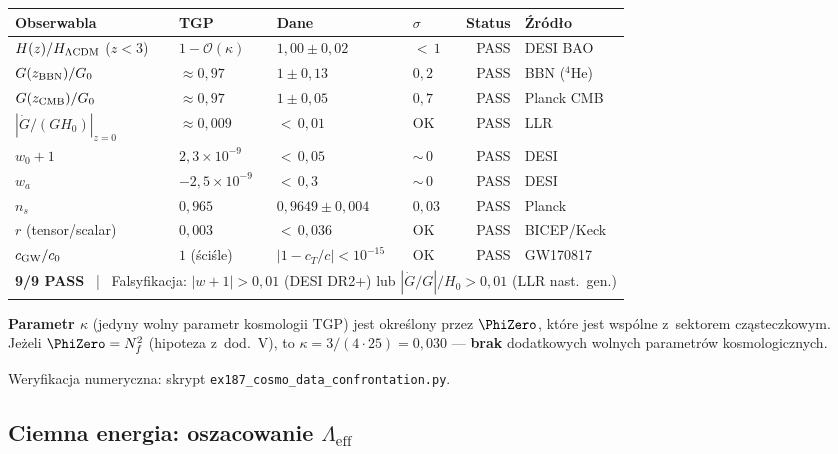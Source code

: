 \begin{remark}
\begin{center}\small
\begin{tabular}{@{}llllrl@{}}
\toprule
\textbf{Obserwabla} & \textbf{TGP} & \textbf{Dane}
  & \textbf{$\sigma$} & \textbf{Status} & \textbf{\'Zr\'od\l{}o} \\
\midrule
$H(z)/H_{\Lambda\rm CDM}$ ($z{<}3$)
  & $1 - \mathcal{O}(\kappa)$
  & $1{,}00 \pm 0{,}02$
  & ${<}\,1$
  & PASS & DESI BAO \\[2pt]
$G(z_{\rm BBN})/G_0$
  & $\approx 0{,}97$
  & $1 \pm 0{,}13$
  & $0{,}2$
  & PASS & BBN ($^4$He) \\[2pt]
$G(z_{\rm CMB})/G_0$
  & $\approx 0{,}97$
  & $1 \pm 0{,}05$
  & $0{,}7$
  & PASS & Planck CMB \\[2pt]
$|\dot G/(GH_0)|_{z=0}$
  & $\approx 0{,}009$
  & ${<}\,0{,}01$
  & OK
  & PASS & LLR \\[2pt]
$w_0 + 1$
  & $2{,}3 \times 10^{-9}$
  & ${<}\,0{,}05$
  & ${\sim}\,0$
  & PASS & DESI \\[2pt]
$w_a$
  & $-2{,}5 \times 10^{-9}$
  & ${<}\,0{,}3$
  & ${\sim}\,0$
  & PASS & DESI \\[2pt]
$n_s$
  & $0{,}965$
  & $0{,}9649 \pm 0{,}004$
  & $0{,}03$
  & PASS & Planck \\[2pt]
$r$ (tensor/scalar)
  & $0{,}003$
  & ${<}\,0{,}036$
  & OK
  & PASS & BICEP/Keck \\[2pt]
$c_{\rm GW}/c_0$
  & $1$ (\'sci\'sle)
  & $|1-c_T/c| < 10^{-15}$
  & OK
  & PASS & GW170817 \\
\midrule
\multicolumn{6}{l}{\textbf{9/9 PASS} ~|~
  Falsyfikacja: $|w+1| > 0{,}01$ (DESI DR2+)
  lub $|\dot G/G|/H_0 > 0{,}01$ (LLR nast.~gen.)} \\
\bottomrule
\end{tabular}
\end{center}

\medskip\noindent
\textbf{Parametr $\kappa$} (jedyny wolny parametr kosmologii TGP)
jest okre\'slony przez $\PhiZero$, kt\'ore jest wsp\'olne z~sektorem
cz\k{a}steczkowym.
Je\.zeli $\PhiZero = N_f^2$ (hipoteza z~dod.~V),
to $\kappa = 3/(4 \cdot 25) = 0{,}030$ --- \textbf{brak} dodatkowych
wolnych parametr\'ow kosmologicznych.

Weryfikacja numeryczna: skrypt \texttt{ex187\_cosmo\_data\_confrontation.py}.
\end{remark}

\subsection{Ciemna energia: oszacowanie $\Lambda_{\mathrm{eff}}$}%
\label{ssec:de-oszacowanie}

